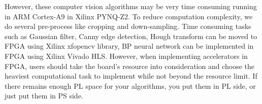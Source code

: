 However, these computer vision algorithms may be very time consuming running in ARM Cortex-A9 in Xilinx PYNQ-Z2. To reduce computation complexity, we do several pre-process like cropping and down-sampling. Time consuming tasks such as Gaussian filter, Canny edge detection, Hough transform can be moved to FPGA using Xilinx xfopencv library\cite{xfopencv}, BP neural network can be implemented in FPGA using Xilinx Vivado HLS. However, when implementing accelerators in FPGA, users should take the board's resource into consideration and choose the heaviest computational task to implement while not beyond the resource limit. If there remains enough PL space for your algorithms, you put them in PL side, or just put them in PS side.